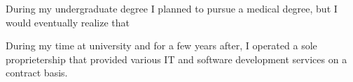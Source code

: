 
During my undergraduate degree I planned to pursue a medical degree,
but I would eventually realize that

During my time at university and for a few years after, I operated a
sole proprietership that provided various IT and software development
services on a contract basis.
